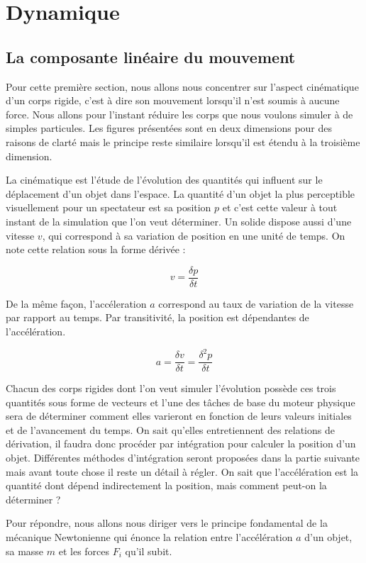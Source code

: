 \documentclass[twocolumn]{article}
\begin{document}
\section{Dynamique} 

\subsection{La composante linéaire du mouvement}

Pour cette première section, nous allons nous concentrer sur l'aspect cinématique d'un corps rigide, c'est à dire son mouvement lorsqu'il n'est soumis à aucune force. Nous allons pour l'instant réduire les corps que nous voulons simuler à de simples particules. Les figures présentées sont en deux dimensions pour des raisons de clarté mais le principe reste similaire lorsqu'il est étendu à la troisième dimension.

La cinématique est l'étude de l'évolution des quantités qui influent sur le déplacement d'un objet dans l'espace. La quantité d'un objet la plus perceptible visuellement pour un spectateur est sa position $p$ et c'est cette valeur à tout instant de la simulation que l'on veut déterminer. Un solide dispose aussi d'une vitesse $v$, qui correspond à sa variation de position en une unité de temps. On note cette relation sous la forme dérivée :

\[v = \frac{\delta p}{\delta t}\]

De la même façon, l'accéleration $a$ correspond au taux de variation de la vitesse par rapport au temps. Par transitivité, la position est dépendantes de l'accélération.

\[a = \frac{\delta v}{\delta t} = \frac{\delta^2 p}{\delta t}\]

Chacun des corps rigides dont l'on veut simuler l'évolution possède ces trois quantités sous forme de vecteurs et l'une des tâches de base du moteur physique sera de déterminer comment elles varieront en fonction de leurs valeurs initiales et de l'avancement du temps. On sait qu'elles entretiennent des relations de dérivation, il faudra donc procéder par intégration pour calculer la position d'un objet. Différentes méthodes d'intégration seront proposées dans la partie suivante mais avant toute chose il reste un détail à régler. On sait que l'accélération est la quantité dont dépend indirectement la position, mais comment peut-on la déterminer ?

Pour répondre, nous allons nous diriger vers le principe fondamental de la mécanique Newtonienne qui énonce la relation entre l'accélération $a$ d'un objet, sa masse $m$ et les forces $F_i$ qu'il subit.
\end{document}
